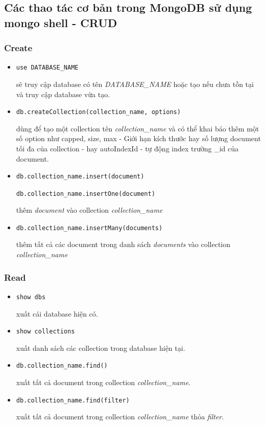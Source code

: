 \subsection{Các thao tác cơ bản trong MongoDB sử dụng mongo shell - CRUD} \label{ssec:MongoDB.3}
\subsubsection{Create}
\begin{itemize}
\item 
\begin{lstlisting} 
use DATABASE_NAME
\end{lstlisting}
sẽ truy cập database có tên \textit{DATABASE\_NAME} hoặc tạo nếu chưa tồn tại và truy cập database vừa tạo.
\item 
\begin{lstlisting}
db.createCollection(collection_name, options)
\end{lstlisting}
dùng để tạo một collection tên \textit{collection\_name} và có thể khai báo thêm một số option như capped, size, max - Giới hạn kích thước hay số lượng document tối đa của collection - hay autoIndexId - tự động index trường \_id của document.
\item
\begin{lstlisting}
db.collection_name.insert(document)

db.collection_name.insertOne(document)
\end{lstlisting}
thêm \textit{document} vào collection \textit{collection\_name}
\item
\begin{lstlisting}
db.collection_name.insertMany(documents)
\end{lstlisting}
thêm tất cả các document trong danh sách \textit{documents} vào collection \textit{collection\_name}
\end{itemize}
\subsubsection{Read}
\begin{itemize}
\item
\begin{lstlisting}
show dbs
\end{lstlisting}
xuất cái database hiện có.
\item
\begin{lstlisting}
show collections
\end{lstlisting}
xuất danh sách các collection trong database hiện tại.
\item
\begin{lstlisting}
db.collection_name.find()
\end{lstlisting}
xuất tất cả document trong collection \textit{collection\_name}.
\item
\begin{lstlisting}
db.collection_name.find(filter)
\end{lstlisting}
xuất tất cả document trong collection \textit{collection\_name} thỏa \textit{filter}.
\end{itemize}
